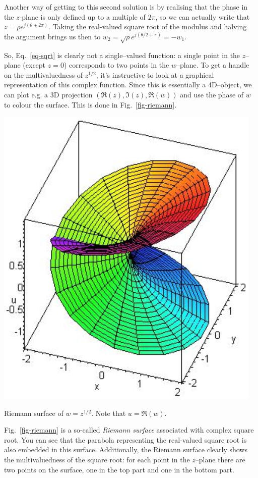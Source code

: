 Another way of getting to this second solution is by realising that the phase in the $z$-plane is only defined up to a multiple of $2\pi$, so we can actually write that  $z=\rho e^{j(\theta +2\pi)}$. Taking the real-valued square root of the modulus and halving the argument brings us then to $w_2 = \sqrt{\rho} e^{j(\theta/2+\pi)} = -w_1$.

So, Eq.~\ref{eq-sqrt} is clearly not a single--valued function: a single point in the $z$--plane (except $z=0$) corresponds to two points in the $w$--plane. To get a handle on the multivaluedness of $z^{1/2}$, it's instructive to look at a graphical representation of this complex function. Since this is essentially a 4D--object, we can plot e.g. a 3D projection $(\Re(z),\Im(z),\Re(w))$ and use the phase of $w$ to colour the surface. This is done in Fig.~\ref{fig-riemann}.

\begin{marginfigure}[-3cm]
\centering
\includegraphics{complex/figures/riemann}
\caption{Riemann surface of $w=z^{1/2}$. Note that $u=\Re(w)$. }
\label{fig-riemann}
\end{marginfigure}

Fig.~\ref{fig-riemann} is a so-called \emph{Riemann surface} associated with complex square root. You can see that the parabola representing the real-valued square root is also embedded in this surface. Additionally, the Riemann surface clearly shows the multivaluedness of the square root: for each point in the $z$--plane there are two points on the surface, one in the top part and one in the bottom part. 

